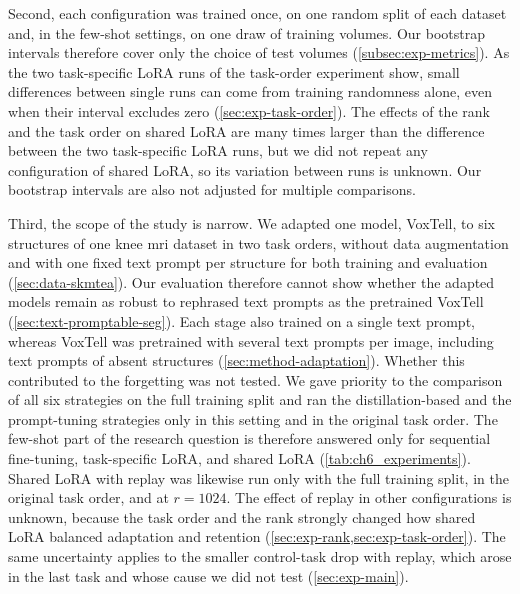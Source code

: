 Second, each configuration was trained once, on one random split of each dataset and, in the few-shot settings, on one draw of training volumes.
Our bootstrap intervals therefore cover only the choice of test volumes (\cref{subsec:exp-metrics}).
As the two task-specific LoRA runs of the task-order experiment show, small differences between single runs can come from training randomness alone, even when their interval excludes zero (\cref{sec:exp-task-order}).
The effects of the rank and the task order on shared LoRA are many times larger than the difference between the two task-specific LoRA runs, but we did not repeat any configuration of shared LoRA, so its variation between runs is unknown.
Our bootstrap intervals are also not adjusted for multiple comparisons.

Third, the scope of the study is narrow.
We adapted one model, VoxTell, to six structures of one knee \gls{mri} dataset in two task orders, without data augmentation and with one fixed text prompt per structure for both training and evaluation (\cref{sec:data-skmtea}).
Our evaluation therefore cannot show whether the adapted models remain as robust to rephrased text prompts as the pretrained VoxTell (\cref{sec:text-promptable-seg}).
Each stage also trained on a single text prompt, whereas VoxTell was pretrained with several text prompts per image, including text prompts of absent structures (\cref{sec:method-adaptation}).
Whether this contributed to the forgetting was not tested.
We gave priority to the comparison of all six strategies on the full training split and ran the distillation-based and the prompt-tuning strategies only in this setting and in the original task order.
The few-shot part of the research question is therefore answered only for sequential fine-tuning, task-specific LoRA, and shared LoRA (\cref{tab:ch6_experiments}).
Shared LoRA with replay was likewise run only with the full training split, in the original task order, and at $r = 1024$.
The effect of replay in other configurations is unknown, because the task order and the rank strongly changed how shared LoRA balanced adaptation and retention (\cref{sec:exp-rank,sec:exp-task-order}).
The same uncertainty applies to the smaller control-task drop with replay, which arose in the last task and whose cause we did not test (\cref{sec:exp-main}).


